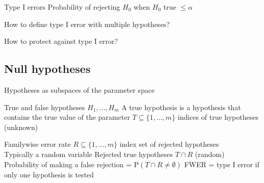 \begin{frame}{Type I errors}
    Probability of rejecting $H_0$ when $H_0$ true $\leq \alpha$
  \eb
    \bi
      \item How to define type I error with multiple hypotheses?
      \item How to protect against type I error?
    \ei
  \eb
\end{frame}



\subsection{Null hypotheses}

\begin{frame}{Hypotheses as subspaces of the parameter space}
\centering
{}
\end{frame}


\begin{frame}{True and false hypotheses}
    $H_1,\ldots,H_m$
  \eb
    A true hypothesis is a hypothesis that contains the true value of the parameter
  \eb
    $T \subseteq \{1,\ldots,m\}$ indices of true hypotheses (unknown)
  \eb
\end{frame}



\begin{frame}{Familywise error rate}
    $R \subseteq \{1,\ldots,m\}$ index set of rejected hypotheses
    \\ Typically a random variable
  \eb
    Rejected true hypotheses $T \cap R$ (random)
  \eb
    Probability of making a false rejection = $\mathrm{P}(T \cap R \neq \emptyset)$
  \eb
    FWER = type I error if only one hypothesis is tested
  \eb
\end{frame}



